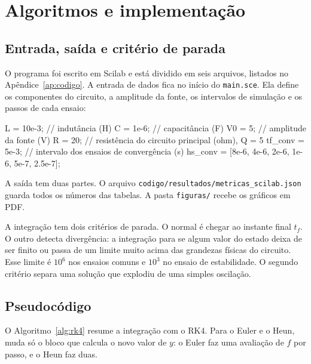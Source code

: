 \section{Algoritmos e implementação}
\label{sec:algoritmos}

\subsection{Entrada, saída e critério de parada}

O programa foi escrito em Scilab e está dividido em seis arquivos, listados no Apêndice~\ref{ap:codigo}. A entrada de dados fica no início do \texttt{main.sce}. Ela define os componentes do circuito, a amplitude da fonte, os intervalos de simulação e os passos de cada ensaio:
\begin{codigo}
L = 10e-3;          // indutância (H)
C = 1e-6;           // capacitância (F)
V0 = 5;             // amplitude da fonte (V)
R = 20;             // resistência do circuito principal (ohm), Q = 5
tf_conv = 5e-3;     // intervalo dos ensaios de convergência (s)
hs_conv = [8e-6, 4e-6, 2e-6, 1e-6, 5e-7, 2.5e-7];
\end{codigo}
A saída tem duas partes. O arquivo \texttt{codigo/resultados/metricas\_scilab.json} guarda todos os números das tabelas. A pasta \texttt{figuras/} recebe os gráficos em PDF.

A integração tem dois critérios de parada. O normal é chegar ao instante final \(t_f\). O outro detecta divergência: a integração para se algum valor do estado deixa de ser finito ou passa de um limite muito acima das grandezas físicas do circuito. Esse limite é \(10^{6}\) nos ensaios comuns e \(10^{3}\) no ensaio de estabilidade. O segundo critério separa uma solução que explodiu de uma simples oscilação.

\subsection{Pseudocódigo}

O Algoritmo~\ref{alg:rk4} resume a integração com o RK4. Para o Euler e o Heun, muda só o bloco que calcula o novo valor de \(y\): o Euler faz uma avaliação de \(f\) por passo, e o Heun faz duas.


